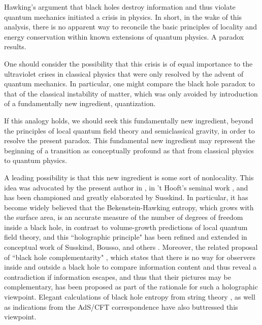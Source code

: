 \Date{}


Hawking's argument that black holes destroy information  and thus violate quantum mechanics initiated a crisis  in physics.  In short, in the wake of this analysis, there is no apparent way to reconcile
the basic principles of locality and energy conservation within known extensions of quantum physics.  A paradox results.

One should consider the possibility that this crisis is of equal importance  to the ultraviolet crises in classical physics that were only resolved by the advent of quantum mechanics.  In particular, one might compare the black hole paradox to that of the classical instability of matter, which was only avoided by introduction of a fundamentally new ingredient,  quantization.

If this analogy holds, we should seek this fundamentally new ingredient, beyond the principles of local quantum field theory and semiclassical gravity, in order to resolve the present paradox.  This fundamental new ingredient may represent the beginning of a transition as conceptually profound as that from classical physics to quantum physics.

A leading possibility is that this new ingredient is some sort of nonlocality.   This idea was advocated by the present author in
, in 't Hooft's seminal work ,  and has been
championed and greatly elaborated by Susskind\Sussholo.  In particular, it has become widely believed that the Bekenstein-Hawking entropy, which grows with the surface area, is an accurate measure of the number of degrees of freedom inside a black hole, in contrast to volume-growth predictions of local quantum field theory, and this  ``holographic principle" has been refined and extended in conceptual work of Susskind, Bousso, and others .  Moreover, the related proposal of  ``black hole complementarity" , which states that there is no way for observers inside and outside a black hole to compare information content and thus reveal a contradiction if information escapes, and thus that their pictures may be complementary, has been proposed as part of the rationale for such a holographic viewpoint.  Elegant calculations of black hole entropy from string theory , as well as indications from the AdS/CFT correspondence  have also buttressed this viewpoint.

